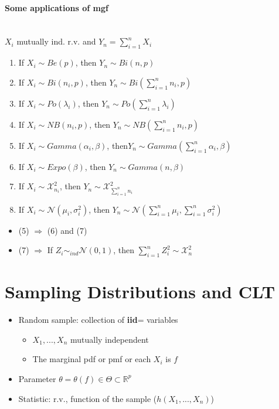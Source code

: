 \documentclass[paper=a4,fontsize=8pt,pagesize,DIV=calc]{scrartcl}
\newcounter{row}
\begin{document}
\begin{multicols}{3}
\paragraph{Some applications of mgf}~~\\
$X_i$ mutually ind. r.v. and $Y_n=\sum^n_{i=1}X_i$
\begin{enumerate}
\item If $X_i\sim Be(p)$, then $Y_n\sim Bi(n,p)$
\item If $X_i\sim Bi(n_i,p)$, then $Y_n\sim Bi(\sum^n_{i=1} n_i,p)$
\item If $X_i\sim Po(\lambda_i)$, then $Y_n\sim Po(\sum^n_{i=1} \lambda_i)$
\item If $X_i\sim NB(n_i,p)$, then $Y_n\sim NB(\sum^n_{i=1} n_i,p)$
\item If $X_i\sim Gamma(\alpha_i,\beta)$, then$Y_n\sim Gamma(\sum^n_{i=1} \alpha_i,\beta)$
\item If $X_i\sim Expo(\beta)$, then $Y_n\sim Gamma(n,\beta)$
\item If $X_i \sim \mathcal{X}^2_{n_i}$, then $Y_n \sim  \mathcal{X}^2_{\sum^n_{i=1} n_i}$
\item If $X_i\sim \mathcal{N}(\mu_i, \sigma_i^2)$, then $Y_n\sim \mathcal{N}(\sum^n_{i=1} \mu_i,\sum^n_{i=1} \sigma^2_i)$
\end{enumerate}
\begin{itemize}
\item (5) $\Rightarrow$ (6) and (7)
\item (7) $\Rightarrow$ If $Z_i\sim_{ind} \mathcal{N}(0,1)$, then  $\sum_{i=1}^n Z^2_i \sim  \mathcal{X}^2_n$ 
\end{itemize}

\section{Sampling Distributions and CLT}
\begin{itemize}
\item Random sample: collection of \textbf{iid}= variables
\begin{itemize}
\item $X_1,...,X_n$ mutually independent
\item The marginal pdf or pmf or each $X_i$ is $f$
\end{itemize}
\item Parameter $\theta=\theta(f)\in \Theta \subset \mathbb{R}^p$
\item Statistic: r.v., function of the sample ($h(X_1,...,X_n)$)
\end{itemize}

\end{multicols}
\end{document}
